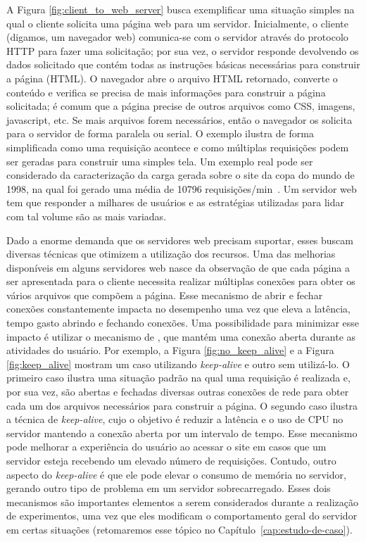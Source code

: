 A Figura \ref{fig:client_to_web_server} busca exemplificar uma situação simples
na qual o cliente solicita uma página web para um servidor. Inicialmente, o
cliente (digamos, um navegador web) comunica-se com o servidor através do
protocolo HTTP para fazer uma solicitação; por sua vez, o servidor responde
devolvendo os dados solicitado que contém todas as instruções básicas
necessárias para construir a página (HTML). O navegador abre o arquivo HTML
retornado, converte o conteúdo e verifica se precisa de mais informações para
construir a página solicitada; é comum que a página precise de outros arquivos
como CSS, imagens, javascript, etc. Se mais arquivos forem necessários, então o
navegador os solicita para o servidor de forma paralela ou serial. O exemplo
ilustra de forma simplificada como uma requisição acontece e como múltiplas
requisições podem ser geradas para construir uma simples tela. Um exemplo real
pode ser considerado da caracterização da carga gerada sobre o site da copa do
mundo de 1998, na qual foi gerado uma média de 10796
requisições/min~\citep{worldcup}.  Um servidor web tem que responder a milhares
de usuários e as estratégias utilizadas para lidar com tal volume são as mais
variadas.

Dado a enorme demanda que os servidores web precisam suportar, esses buscam
diversas técnicas que otimizem a utilização dos recursos. Uma das melhorias
disponíveis em alguns servidores web nasce da observação de que cada página a
ser apresentada para o cliente necessita realizar múltiplas conexões para obter
os vários arquivos que compõem a página. Esse mecanismo de abrir e fechar
conexões constantemente impacta no desempenho uma vez que eleva a latência,
tempo gasto abrindo e fechando conexões. Uma possibilidade para minimizar esse
impacto é utilizar o mecanismo de , que mantém uma
conexão aberta durante as atividades do usuário. Por exemplo, a Figura
\ref{fig:no_keep_alive} e a Figura \ref{fig:keep_alive} mostram um caso
utilizando \emph{keep-alive} e outro sem utilizá-lo. O primeiro caso ilustra
uma situação padrão na qual uma requisição é realizada e, por sua vez, são
abertas e fechadas diversas outras conexões de rede para obter cada um dos
arquivos necessários para construir a página. O segundo caso ilustra a técnica
de \emph{keep-alive}, cujo o objetivo é reduzir a latência e o uso de CPU no
servidor mantendo a conexão aberta por um intervalo de tempo.  Esse mecanismo
pode melhorar a experiência do usuário ao acessar o site em casos que um
servidor esteja recebendo um elevado número de requisições. Contudo, outro
aspecto do \emph{keep-alive} é que ele pode elevar o consumo de memória no
servidor, gerando outro tipo de problema em um servidor sobrecarregado. Esses
dois mecanismos são importantes elementos a serem considerados durante a
realização de experimentos, uma vez que eles modificam o comportamento geral do
servidor em certas situações (retomaremos esse tópico no
Capítulo~\ref{cap:estudo-de-caso}).


